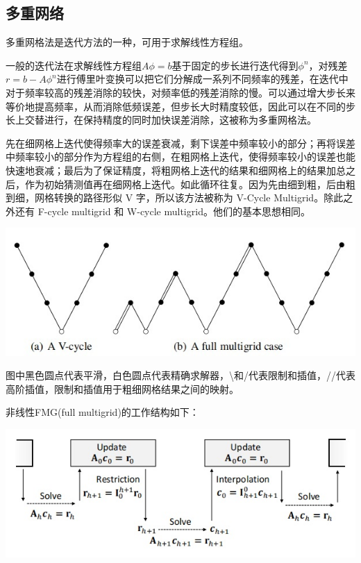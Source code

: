 \documentclass{CLGPY}
\begin{document}
\begin{multicols}{2}
		\section{多重网络\textsuperscript{\cite{6}}}
		多重网格法是迭代方法的一种，可用于求解线性方程组。

		一般的迭代法在求解线性方程组$A\phi=b$基于固定的步长进行迭代得到$\phi ^n$，对残差$r=b-A\phi^{n}$进行傅里叶变换可以把它们分解成一系列不同频率的残差，在迭代中对于频率较高的残差消除的较快，对频率低的残差消除的慢。可以通过增大步长来等价地提高频率，从而消除低频误差，但步长大时精度较低，因此可以在不同的步长上交替进行，在保持精度的同时加快误差消除，这被称为多重网格法。

		先在细网格上迭代使得频率大的误差衰减，剩下误差中频率较小的部分；再将误差中频率较小的部分作为方程组的右侧，在粗网格上迭代，使得频率较小的误差也能快速地衰减；最后为了保证精度，将粗网格上迭代的结果和细网格上的结果加总之后，作为初始猜测值再在细网格上迭代。如此循环往复。因为先由细到粗，后由粗到细，网格转换的路径形似 V 字，所以该方法被称为 V-Cycle Multigrid。除此之外还有 F-cycle multigrid 和 W-cycle multigrid。他们的基本思想相同。
        \begin{center}
            \includegraphics[width=1.0\linewidth]{./fig/multigrid.jpg}
        \end{center}
		
		图中黑色圆点代表平滑，白色圆点代表精确求解器，\textbackslash 和/代表限制和插值，//代表高阶插值，限制和插值用于粗细网格结果之间的映射。

		非线性FMG(full multigrid)的工作结构如下：
        \begin{center}
            \includegraphics[width=1.0\linewidth]{./fig/非线性FMG.jpg}
        \end{center}


\end{multicols}
\end{document}

